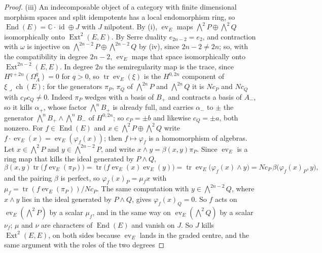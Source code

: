\documentclass[11pt,reqno]{amsart}
\theoremstyle{plain}
\theoremstyle{definition}
\theoremstyle{remark}
\newcommand{\CC}{\mathbb{C}}
\DeclareMathOperator{\ch}{ch}
\DeclareMathOperator{\End}{End}
\DeclareMathOperator{\Ext}{Ext}
\DeclareMathOperator{\id}{id}
\begin{document}
\begin{proof}
(iii) An indecomposable object of a category with finite dimensional
morphism spaces and split idempotents has a local endomorphism ring, so
$\End(E)=\CC\cdot\id\oplus J$ with $J$ nilpotent. By
(i), $\operatorname{ev}_{E}$ maps
$\bigwedge^{2}P\oplus\bigwedge^{2}Q$ isomorphically onto $\Ext^{2}(E,E)$.
By Serre duality $e_{2n-2}=e_{2}$, and contraction with $\omega$ is injective
on $\bigwedge^{2n-2}P\oplus\bigwedge^{2n-2}Q$ by (iv),
since $2n-2\ne2n$; so, with the compatibility in
degree $2n-2$, $\operatorname{ev}_{E}$ maps that space isomorphically onto
$\Ext^{2n-2}(E,E)$. In degree $2n$ the semiregularity map is the trace, since
$H^{q+2n}(\Omega^{q}_{A})=0$ for $q>0$, so
$\operatorname{tr}\operatorname{ev}_{E}(\xi)$ is the $H^{0,2n}$ component of
$\xi\lrcorner\ch(E)$; for the generators $\pi_{P}$, $\pi_{Q}$ of
$\bigwedge^{2n}P$ and $\bigwedge^{2n}Q$ it is $Nc_{P}$ and $Nc_{Q}$ with
$c_{P}c_{Q}\ne0$. Indeed $\pi_{P}$ wedges with a basis of $B_{+}$ and contracts
a basis of $A_{-}$, so it kills $\alpha_{+}$, whose factor $\bigwedge^{n}B_{+}$
is already full, and carries $\alpha_{-}$ to $\pm$ the generator
$\bigwedge^{n}B_{+}\wedge\bigwedge^{n}B_{-}$ of $H^{0,2n}$; so $c_{P}=\pm b$
and likewise $c_{Q}=\pm a$, both nonzero. For $f\in\End(E)$ and
$x\in\bigwedge^{2}P\oplus\bigwedge^{2}Q$ write
$f\cdot\operatorname{ev}_{E}(x)=\operatorname{ev}_{E}(\varphi_{f}(x))$; then
$f\mapsto\varphi_{f}$ is a homomorphism of algebras. Let $x\in\bigwedge^{2}P$
and $y\in\bigwedge^{2n-2}P$, and write $x\wedge y=\beta(x,y)\pi_{P}$. Since
$\operatorname{ev}_{E}$ is a ring map that kills the ideal generated by
$P\wedge Q$,
\[
  \beta(x,y)\operatorname{tr}\bigl(f\operatorname{ev}_{E}(\pi_{P})\bigr)
  =\operatorname{tr}\bigl(f\operatorname{ev}_{E}(x)\operatorname{ev}_{E}(y)\bigr)
  =\operatorname{tr}\operatorname{ev}_{E}\bigl(\varphi_{f}(x)\wedge y\bigr)
  =Nc_{P}\,\beta\bigl(\varphi_{f}(x)_{P},y\bigr),
\]
and the pairing $\beta$ is perfect, so $\varphi_{f}(x)_{P}=\mu_{f}x$ with
$\mu_{f}=\operatorname{tr}(f\operatorname{ev}_{E}(\pi_{P}))/Nc_{P}$. The same
computation with $y\in\bigwedge^{2n-2}Q$, where $x\wedge y$ lies in the ideal
generated by $P\wedge Q$, gives $\varphi_{f}(x)_{Q}=0$. So $f$ acts on
$\operatorname{ev}_{E}(\bigwedge^{2}P)$ by a scalar $\mu_{f}$, and in the same
way on $\operatorname{ev}_{E}(\bigwedge^{2}Q)$ by a scalar $\nu_{f}$; $\mu$ and
$\nu$ are characters of $\End(E)$ and vanish on $J$. So $J$ kills
$\Ext^{2}(E,E)$, on both sides because $\operatorname{ev}_{E}$ lands in the
graded centre, and the same argument with the roles of the two degrees

\end{proof}
\end{document}
